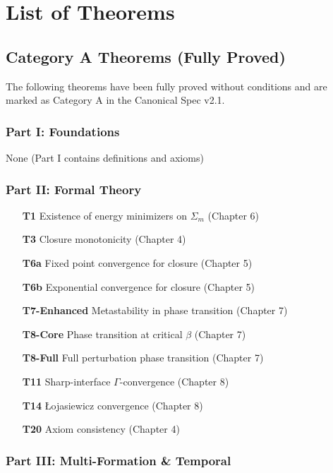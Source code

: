 \chapter*{List of Theorems}

\section*{Category A Theorems (Fully Proved)}

The following theorems have been fully proved without conditions and are marked as Category A in the Canonical Spec v2.1.

\subsection*{Part I: Foundations}
None (Part I contains definitions and axioms)

\subsection*{Part II: Formal Theory}

\begin{enumerate}
  \item[\textbf{T1}] Existence of energy minimizers on $\Sigma_m$ (Chapter 6)
  \item[\textbf{T3}] Closure monotonicity (Chapter 4)
  \item[\textbf{T6a}] Fixed point convergence for closure (Chapter 5)
  \item[\textbf{T6b}] Exponential convergence for closure (Chapter 5)
  \item[\textbf{T7-Enhanced}] Metastability in phase transition (Chapter 7)
  \item[\textbf{T8-Core}] Phase transition at critical $\beta$ (Chapter 7)
  \item[\textbf{T8-Full}] Full perturbation phase transition (Chapter 7)
  \item[\textbf{T11}] Sharp-interface $\Gamma$-convergence (Chapter 8)
  \item[\textbf{T14}] \L ojasiewicz convergence (Chapter 8)
  \item[\textbf{T20}] Axiom consistency (Chapter 4)
\end{enumerate}

\subsection*{Part III: Multi-Formation \& Temporal}

